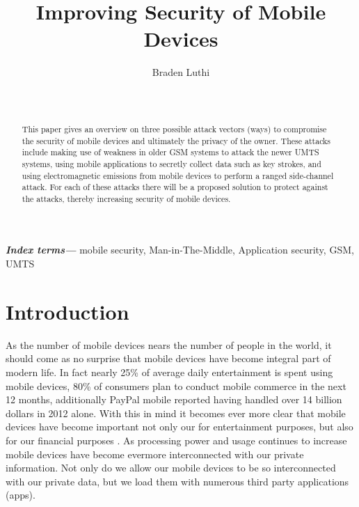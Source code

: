 \documentclass{sig-alternate}
\providecommand{\keywords}[1]{\textbf{\textit{Index terms---}} #1}
\begin{document}

\title{Improving Security of Mobile Devices}


\author{
\alignauthor
Braden Luthi\\
	\\
	\\
}

\maketitle
\begin{abstract}
	This paper gives an overview on three possible attack vectors (ways) to compromise the security of mobile devices and ultimately the privacy of the owner. These attacks include making use of weakness in older GSM systems to attack the newer UMTS systems, using mobile applications to secretly collect data such as key strokes, and using electromagnetic emissions from mobile devices to perform a ranged side-channel attack. For each of these attacks there will be a proposed solution to protect against the attacks, thereby increasing security of mobile devices.
	
\end{abstract}
\keywords{mobile security, Man-in-The-Middle, Application security, GSM, UMTS}

\section{Introduction}

As the number of mobile devices nears the number of people in the world, it should come as no surprise that mobile devices have become integral part of modern life. In fact nearly 25\% of average daily entertainment is spent using mobile devices, 80\% of consumers plan to conduct mobile commerce in the next 12 months, additionally PayPal mobile reported having handled over 14 billion dollars in 2012 alone. With this in mind it becomes ever more clear that mobile devices have become important not only our for entertainment purposes, but also for our financial purposes \cite{mobile-usage}. As processing power and usage continues to increase mobile devices have become evermore interconnected with our private information.  Not only do we allow our mobile devices to be so interconnected with our private data, but we load them with numerous third party applications (apps).   
\end{document}
